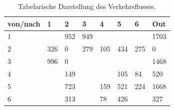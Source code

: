 \begin{table}[H]
\centering
\begin{tabular}{|p{1.5cm}|p{1.5cm}|p{1.5cm}|p{1.5cm}|p{1.5cm}|p{1.5cm}|p{1.5cm}|p{1.5cm}|}
\hline
	von/nach & 1 & 2 & 3 & 4 & 5 & 6 & Out \\ \hline
	1 &  & 952 & 949 &  &  &  & 1703 \\ \hline
	2 & 326 & 0 & 279 & 105 & 434 & 275 & 0 \\ \hline
	3 & 996 & 0 &  &  &  &  & 1468 \\ \hline
	4 &  & 149 &  &  & 105 & 84 & 520 \\ \hline
	5 &  & 723 &  & 159 & 521 & 224 & 1668 \\ \hline
	6 &  & 313 &  & 78 & 426 &  & 327 \\ \hline
\end{tabular}
\caption{Tabelarische Darstellung des Verkehrsflusses.}
\label{tVerkehrsfluss}
\end{table}

\setlength\tabcolsep{0pt}